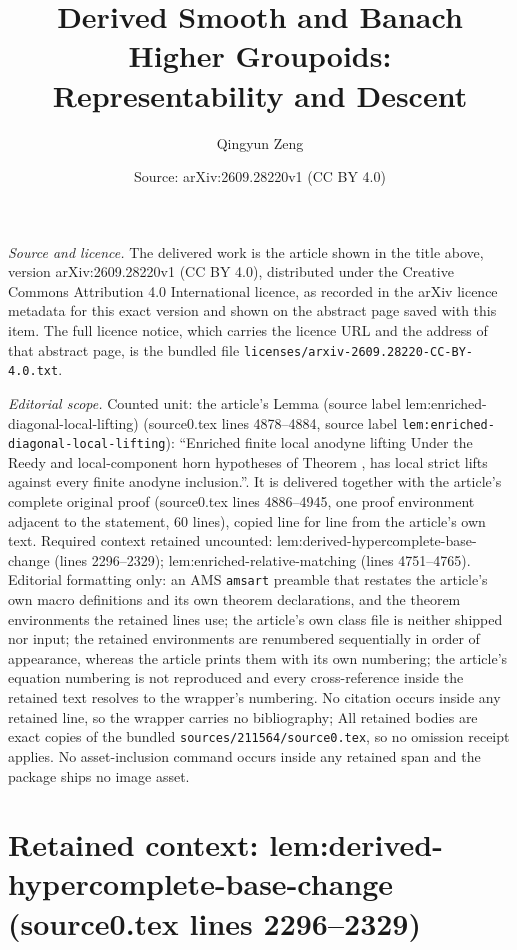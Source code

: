 \documentclass[10pt,a4paper]{amsart}
\title[Derived Smooth and Banach Higher Groupoids: Representability and Descent]{Derived Smooth and Banach Higher Groupoids: Representability and Descent}
\author{Qingyun Zeng}
\date{Source: arXiv:2609.28220v1 (CC BY 4.0)}
\theoremstyle{plain}
\theoremstyle{definition}
\theoremstyle{remark}
\begin{document}
\maketitle

\noindent\emph{Source and licence.} The delivered work is the article shown in the title above, version arXiv:2609.28220v1 (CC BY 4.0), distributed under the Creative Commons Attribution 4.0 International licence, as recorded in the arXiv licence metadata for this exact version and shown on the abstract page saved with this item. The full licence notice, which carries the licence URL and the address of that abstract page, is the bundled file \texttt{licenses/arxiv-2609.28220-CC-BY-4.0.txt}.
\par\smallskip

\noindent\textit{Editorial scope.} Counted unit: the article's Lemma (source label lem:enriched-diagonal-local-lifting) (source0.tex lines 4878--4884, source label \texttt{lem:enriched-diagonal-local-lifting}): ``Enriched finite local anodyne lifting Under the Reedy and local-component horn hypotheses of Theorem , has local strict lifts against every finite anodyne inclusion.''. It is delivered together with the article's complete original proof (source0.tex lines 4886--4945, one proof environment adjacent to the statement, 60 lines), copied line for line from the article's own text. Required context retained uncounted: lem:derived-hypercomplete-base-change (lines 2296--2329); lem:enriched-relative-matching (lines 4751--4765). Editorial formatting only: an AMS \texttt{amsart} preamble that restates the article's own macro definitions and its own theorem declarations, and the theorem environments the retained lines use; the article's own class file is neither shipped nor input; the retained environments are renumbered sequentially in order of appearance, whereas the article prints them with its own numbering; the article's equation numbering is not reproduced and every cross-reference inside the retained text resolves to the wrapper's numbering. No citation occurs inside any retained line, so the wrapper carries no bibliography; All retained bodies are exact copies of the bundled \texttt{sources/211564/source0.tex}, so no omission receipt applies. No asset-inclusion command occurs inside any retained span and the package ships no image asset.


\section*{Retained context: lem:derived-hypercomplete-base-change (source0.tex lines 2296--2329)}
\end{document}
